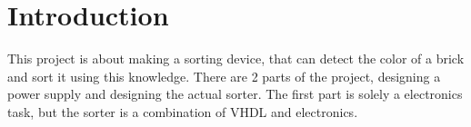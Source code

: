 \section{Introduction}
This project is about making a sorting device, that can detect the color of a brick and sort it using this knowledge. 
There are 2 parts of the project, designing a power supply and designing the actual sorter. 
The first part is solely a electronics task, but the sorter is a combination of VHDL and electronics. 
